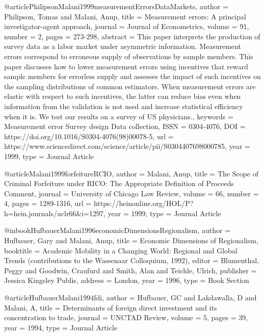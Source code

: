 

@article{PhilipsonMalani1999measurementErrorsDataMarkets,
   author = {Philipson, Tomas and Malani, Anup},
   title = {Measurement errors: A principal investigator-agent approach},
   journal = {Journal of Econometrics},
   volume = {91},
   number = {2},
   pages = {273-298},
   abstract = {This paper interprets the production of survey data as a labor market under asymmetric information. Measurement errors correspond to erroneous supply of observations by sample members. This paper discusses how to lower measurement errors using incentives that reward sample members for errorless supply and assesses the impact of such incentives on the sampling distributions of common estimators. When measurement errors are elastic with respect to such incentives, the latter can reduce bias even when information from the validation is not used and increase statistical efficiency when it is. We test our results on a survey of US physicians.},
   keywords = {Measurement error
Survey design
Data collection},
   ISSN = {0304-4076},
   DOI = {https://doi.org/10.1016/S0304-4076(98)00078-5},
   url = {https://www.sciencedirect.com/science/article/pii/S0304407698000785},
   year = {1999},
   type = {Journal Article}
}

@article{Malani1999forfeitureRCIO,
   author = {Malani, Anup},
   title = {The Scope of Criminal Forfeiture under RICO: The Appropriate Definition of Proceeds Comment},
   journal = {University of Chicago Law Review},
   volume = {66},
   number = {4},
   pages = {1289-1316},
   url = {https://heinonline.org/HOL/P?h=hein.journals/uclr66&i=1297},
   year = {1999},
   type = {Journal Article}
}




@inbook{HufbauerMalani1996economicDimensionsRegionalism,
   author = {Hufbauer, Gary and Malani, Anup},
   title = {Economic Dimensions of Regionalism},
   booktitle = {Academic Mobility in a Changing World: Regional and Global Trends (contributions to the Wassenaar Colloquium, 1992)},
   editor = {Blumenthal, Peggy and Goodwin, Craufurd and Smith, Alan and Teichle, Ulrich},
   publisher = {Jessica Kingsley Publis},
   address = {London},
   year = {1996},
   type = {Book Section}
}



@article{HufbauerMalani1994fdi,
   author = {Hufbauer, GC and Lakdawalla, D and Malani, A},
   title = {Determinants of foreign direct investment and its concentration to trade},
   journal = {UNCTAD Review},
   volume = {5},
   pages = {39},
   year = {1994},
   type = {Journal Article}
}


